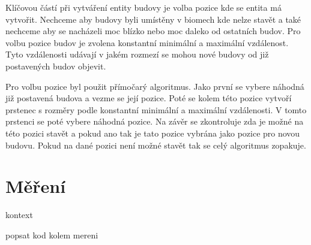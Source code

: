Klíčovou částí při vytváření entity budovy je volba pozice kde se entita má vytvořit. Nechceme aby budovy byli umístěny v biomech kde nelze stavět a také nechceme aby se nacházeli moc blízko nebo moc daleko od ostatních budov. Pro volbu pozice budov je zvolena konstantní minimální a maximální vzdálenost. Tyto vzdálenosti udávají v jakém rozmezí se mohou nové budovy od již postavených budov objevit.

Pro volbu pozice byl použit přímočarý algoritmus. Jako první se vybere náhodná již postavená budova a vezme se její pozice. Poté se kolem této pozice vytvoří prstenec s rozměry podle konstantní minimální a maximální vzdálenosti. V tomto prstenci se poté vybere náhodná pozice. Na závěr se zkontroluje zda je možné na této pozici stavět a pokud ano tak je tato pozice vybrána jako pozice pro novou budovu. Pokud na dané pozici není možné stavět tak se celý algoritmus zopakuje.

\section{Měření}
kontext

popsat kod kolem mereni


































